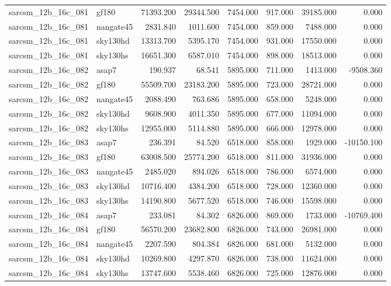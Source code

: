 \begin{tabular}{llrrrrrr}
sarcsm\_12b\_16c\_081 & gf180 & 71393.200 & 29344.500 & 7454.000 & 917.000 & 39185.000 & 0.000 \\
sarcsm\_12b\_16c\_081 & nangate45 & 2831.840 & 1011.600 & 7454.000 & 859.000 & 7488.000 & 0.000 \\
sarcsm\_12b\_16c\_081 & sky130hd & 13313.700 & 5395.170 & 7454.000 & 931.000 & 17550.000 & 0.000 \\
sarcsm\_12b\_16c\_081 & sky130hs & 16651.300 & 6587.010 & 7454.000 & 898.000 & 18513.000 & 0.000 \\
sarcsm\_12b\_16c\_082 & asap7 & 190.937 & 68.541 & 5895.000 & 711.000 & 1413.000 & -9508.360 \\
sarcsm\_12b\_16c\_082 & gf180 & 55509.700 & 23183.200 & 5895.000 & 723.000 & 28721.000 & 0.000 \\
sarcsm\_12b\_16c\_082 & nangate45 & 2088.490 & 763.686 & 5895.000 & 658.000 & 5248.000 & 0.000 \\
sarcsm\_12b\_16c\_082 & sky130hd & 9608.900 & 4011.350 & 5895.000 & 677.000 & 11094.000 & 0.000 \\
sarcsm\_12b\_16c\_082 & sky130hs & 12955.000 & 5114.880 & 5895.000 & 666.000 & 12978.000 & 0.000 \\
sarcsm\_12b\_16c\_083 & asap7 & 236.391 & 84.520 & 6518.000 & 858.000 & 1929.000 & -10150.100 \\
sarcsm\_12b\_16c\_083 & gf180 & 63008.500 & 25774.200 & 6518.000 & 811.000 & 31936.000 & 0.000 \\
sarcsm\_12b\_16c\_083 & nangate45 & 2485.020 & 894.026 & 6518.000 & 786.000 & 6574.000 & 0.000 \\
sarcsm\_12b\_16c\_083 & sky130hd & 10716.400 & 4384.200 & 6518.000 & 728.000 & 12360.000 & 0.000 \\
sarcsm\_12b\_16c\_083 & sky130hs & 14190.800 & 5677.520 & 6518.000 & 746.000 & 15598.000 & 0.000 \\
sarcsm\_12b\_16c\_084 & asap7 & 233.081 & 84.302 & 6826.000 & 869.000 & 1733.000 & -10769.400 \\
sarcsm\_12b\_16c\_084 & gf180 & 56570.200 & 23682.800 & 6826.000 & 743.000 & 26981.000 & 0.000 \\
sarcsm\_12b\_16c\_084 & nangate45 & 2207.590 & 804.384 & 6826.000 & 681.000 & 5132.000 & 0.000 \\
sarcsm\_12b\_16c\_084 & sky130hd & 10269.800 & 4297.870 & 6826.000 & 738.000 & 11624.000 & 0.000 \\
sarcsm\_12b\_16c\_084 & sky130hs & 13747.600 & 5538.460 & 6826.000 & 725.000 & 12876.000 & 0.000 \\

\end{tabular}
